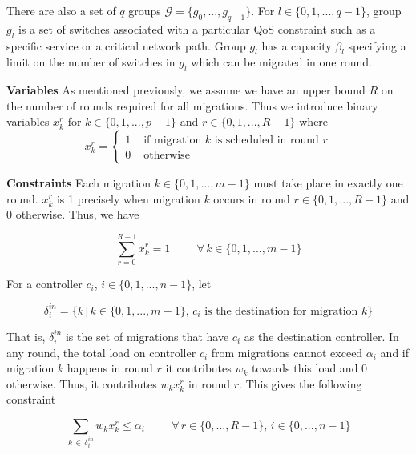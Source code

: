 \documentclass[letterpaper,12pt,titlepage,oneside,final]{article}
\begin{document}
There are also a set of $q$ groups $\mathcal{G} = \{g_{0}, ..., g_{q-1}\}$. For $l \in \{0, 1, ..., q - 1\}$, group $g_{l}$ is a set of switches associated with a particular QoS constraint such as a specific service or a critical network path. Group $g_{l}$ has a capacity $\beta_{l}$ specifying a limit on the number of switches in $g_{l}$ which can be migrated in one round.

\noindent\textbf{Variables}\newline
\noindent As mentioned previously, we assume we have an upper bound $R$ on the number of rounds required for all migrations. Thus we introduce binary variables $x^{r}_{k}$ for $k \in \{0, 1, ..., p - 1\}$ and $r \in \{0, 1, ..., R - 1\}$ where
\[
    x^{r}_{k} =
    \begin{cases}
        1 &\text{ if migration } k \text { is scheduled in round } r \\
        0 &\text{ otherwise}
    \end{cases}
\]

\noindent\textbf{Constraints}\newline
\noindent Each migration $k \in \{0, 1, ..., m - 1\}$ must take place in exactly one round. $x^{r}_{k}$ is 1 precisely when migration $k$ occurs in round $r \in \{0, 1, ..., R-1\}$ and 0 otherwise. Thus, we have

\begin{equation}\label{eq:single-migration}
    \sum_{r=0}^{R-1} x^{r}_{k} = 1 \hspace{1cm} \forall \, k \in \{0, 1, ..., m - 1\}
\end{equation}

\noindent For a controller $c_{i}$, $i \in \{0, 1, ..., n - 1\}$, let 

$$\delta^{in}_{i} = \{k \, | \, k \in \{0, 1, ..., m-1\}, \, c_{i} \text{ is the destination for migration } k\}$$

That is, $\delta^{in}_{i}$ is the set of migrations that have $c_{i}$ as the destination controller. In any round, the total load on controller $c_{i}$ from migrations cannot exceed $\alpha_{i}$ and if migration $k$ happens in round $r$ it contributes $w_{k}$ towards this load and 0 otherwise. Thus, it contributes $w_{k}x^{r}_{k}$ in round $r$. This gives the following constraint

\begin{equation}\label{eq:controller-simple}
    \sum_{k \, \in \, \delta^{in}_{i}} w_{k}x^{r}_{k} \leq \alpha_{i} \hspace{1cm} \forall \, r \in \{0, ..., R-1\}, \, i \in \{0, ..., n-1\}
\end{equation}
\end{document}
